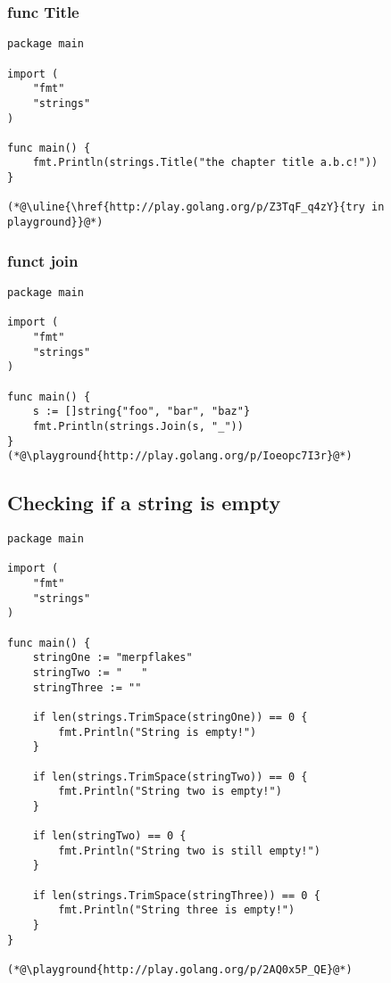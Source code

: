 \subsubsection{func Title}
\begin{lstlisting}
package main

import (
	"fmt"
	"strings"
)

func main() {
	fmt.Println(strings.Title("the chapter title a.b.c!"))
}

(*@\uline{\href{http://play.golang.org/p/Z3TqF_q4zY}{try in playground}}@*)
\end{lstlisting}

\subsubsection*{funct join}


\def\playground#1{\uline{\href{#1}{playground}}}
\begin{lstlisting}
package main

import (
	"fmt"
	"strings"
)

func main() {
	s := []string{"foo", "bar", "baz"}
	fmt.Println(strings.Join(s, "_"))
}
(*@\playground{http://play.golang.org/p/Ioeopc7I3r}@*)
\end{lstlisting}


\subsection{Checking if a string is empty}

\begin{lstlisting}
package main

import (
	"fmt"
	"strings"
)

func main() {
	stringOne := "merpflakes"
	stringTwo := "   "
	stringThree := ""

	if len(strings.TrimSpace(stringOne)) == 0 {
		fmt.Println("String is empty!")
	}

	if len(strings.TrimSpace(stringTwo)) == 0 {
		fmt.Println("String two is empty!")
	}

	if len(stringTwo) == 0 {
		fmt.Println("String two is still empty!")
	}

	if len(strings.TrimSpace(stringThree)) == 0 {
		fmt.Println("String three is empty!")
	}
}

(*@\playground{http://play.golang.org/p/2AQ0x5P_QE}@*)
\end{lstlisting}





